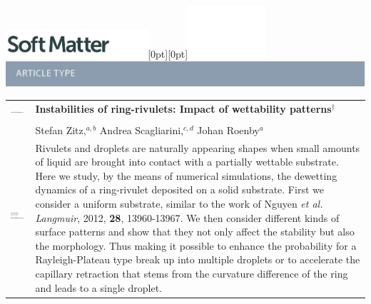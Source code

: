 \documentclass[twoside,twocolumn,9pt]{article}
\begin{document}
  \begin{@twocolumnfalse}
{\includegraphics[height=30pt]{head_foot/SM}\hfill\raisebox{0pt}[0pt][0pt]{\includegraphics[height=55pt]{head_foot/RSC_LOGO_CMYK}}\\[1ex]
\includegraphics[width=18.5cm]{head_foot/header_bar}}\par
\vspace{1em}
\sffamily
\begin{tabular}{m{4.5cm} p{13.5cm} }

\includegraphics{head_foot/DOI} & \noindent\LARGE{\textbf{Instabilities of ring-rivulets: Impact of wettability patterns$^\dag$}} \\%
\vspace{0.3cm} & \vspace{0.3cm} \\

 & \noindent\large{Stefan Zitz,\textit{$^{a,b}$} Andrea Scagliarini,\textit{$^{c,d}$} Johan Roenby\textit{$^{a}$}} \\%

\includegraphics{head_foot/dates} & \noindent\normalsize{
Rivulets and droplets are naturally appearing shapes when small amounts of liquid are brought into contact with a partially wettable substrate.
Here we study, by the means of numerical simulations, the dewetting dynamics of a ring-rivulet deposited on a solid substrate.
First we consider a uniform substrate, similar to the work of Nguyen \textit{et al. Langmuir}, 2012, \textbf{28}, 13960-13967.
We then consider different kinds of surface patterns and show that they not only affect the stability but also the morphology.
Thus making it possible to enhance the probability for a Rayleigh-Plateau type break up into multiple droplets or to accelerate the capillary retraction that stems from the curvature difference of the ring and leads to a single droplet.
}


\end{tabular}
\end{@twocolumnfalse}
\end{document}

